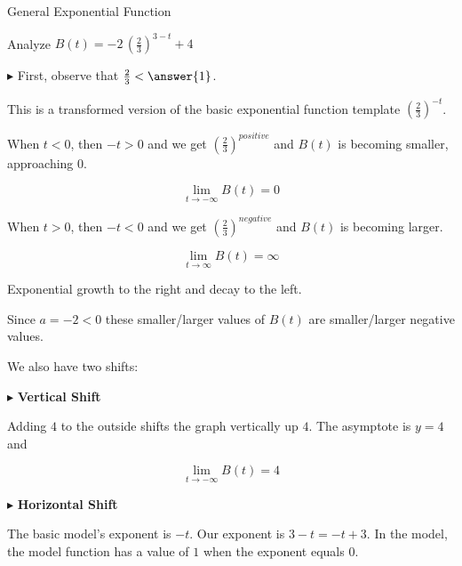 \documentclass{ximera}
\begin{document}
\begin{example}  General Exponential Function



Analyze   $B(t) = -2 \, \left( \frac{2}{3} \right)^{3-t} + 4$ \\


\begin{explanation}



$\blacktriangleright$  First, observe that $\frac{2}{3} < \answer{1}$.

\begin{model}

This is a transformed version of the basic exponential function template $\left( \frac{2}{3} \right)^{-t}$.  



When $t < 0$, then $-t > 0$ and we get  $\left( \frac{2}{3} \right)^{positive}$ and $B(t)$ is becoming smaller, approaching $0$.  





\[ \lim\limits_{t \to -\infty} B(t) = 0 \]



When $t > 0$, then $-t < 0$ and we get  $\left( \frac{2}{3} \right)^{negative}$ and $B(t)$ is becoming larger.  



\[ \lim\limits_{t \to \infty} B(t) = \infty \]




Exponential growth to the right and decay to the left.



\end{model}


Since $a = -2 < 0$ these smaller/larger values of $B(t)$ are smaller/larger negative values.



We also have two shifts:




$\blacktriangleright$ \textbf{Vertical Shift}


Adding $4$ to the outside shifts the graph vertically up $4$.  The asymptote is $y = 4$ and 

\[ \lim\limits_{t \to -\infty} B(t) = 4 \]



$\blacktriangleright$ \textbf{Horizontal Shift}


The basic model's exponent is $-t$.  Our exponent is $3 - t = -t + 3$.  In the model, the model function has a value of $1$ when the exponent equals $0$.





\end{explanation}
\end{example}
\end{document}
